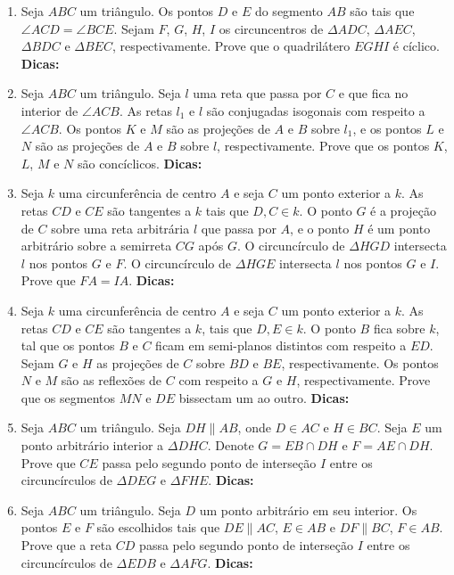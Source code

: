 \documentclass{article}
\newcommand{\dica}{\textbf{Dicas:}}
\newcommand{\iniTri}{Seja $ABC$ um triângulo}
\begin{document}
\begin{multicols}{2}
\begin{enumerate}
    \item \iniTri. Os pontos $D$ e $E$ do segmento $AB$ são tais que $\angle ACD=\angle BCE$. Sejam $F$, $G$, $H$, $I$ os circuncentros de $\Delta ADC$, $\Delta AEC$, $\Delta BDC$ e $\Delta BEC$, respectivamente. Prove que o quadrilátero $EGHI$ é cíclico. \dica %
    
    \item \iniTri. Seja $l$ uma reta que passa por $C$ e que fica no interior de $\angle ACB$. As retas $l_1$ e $l$ são conjugadas isogonais com respeito a $\angle ACB$. Os pontos $K$ e $M$ são as projeções de $A$ e $B$ sobre $l_1$, e os pontos $L$ e $N$ são as projeções de $A$ e $B$ sobre $l$, respectivamente. Prove que os pontos $K$, $L$, $M$ e $N$ são concíclicos. \dica %
    
    \item Seja $k$ uma circunferência de centro $A$ e seja $C$ um ponto exterior a $k$. As retas $CD$ e $CE$ são tangentes a $k$ tais que $D, C\in k$. O ponto $G$ é a projeção de $C$ sobre uma reta arbitrária $l$ que passa por $A$, e o ponto $H$ é um ponto arbitrário sobre a semirreta $CG$ após $G$. O circuncírculo de $\Delta HGD$ intersecta $l$ nos pontos $G$ e $F$. O circuncírculo de $\Delta HGE$ intersecta $l$ nos pontos $G$ e $I$. Prove que $FA=IA$. \dica %
    
    \item Seja $k$ uma circunferência de centro $A$ e seja $C$ um ponto exterior a $k$. As retas $CD$ e $CE$ são tangentes a $k$, tais que $D, E\in k$. O ponto $B$ fica sobre $k$, tal que os pontos $B$ e $C$ ficam em semi-planos distintos com respeito a $ED$. Sejam $G$ e $H$ as projeções de $C$ sobre $BD$ e $BE$, respectivamente. Os pontos $N$ e $M$ são as reflexões de $C$ com respeito a $G$ e $H$, respectivamente. Prove que os segmentos $MN$ e $DE$ bissectam um ao outro. \dica %
    
    \item \iniTri. Seja $DH\parallel AB$, onde $D\in AC$ e $H\in BC$. Seja $E$ um ponto arbitrário interior a $\Delta DHC$. Denote $G=EB\cap DH$ e $F=AE\cap DH$. Prove que $CE$ passa pelo segundo ponto de interseção $I$ entre os circuncírculos de $\Delta DEG$ e $\Delta FHE$. \dica %
    
    \item \iniTri. Seja $D$ um ponto arbitrário em seu interior. Os pontos $E$ e $F$ são escolhidos tais que $DE\parallel AC$, $E\in AB$ e $DF\parallel BC$, $F\in AB$. Prove que a reta $CD$ passa pelo segundo ponto de interseção $I$ entre os circuncírculos de $\Delta EDB$ e $\Delta AFG$. \dica %
    

\end{enumerate}
\end{multicols}
\end{document}
